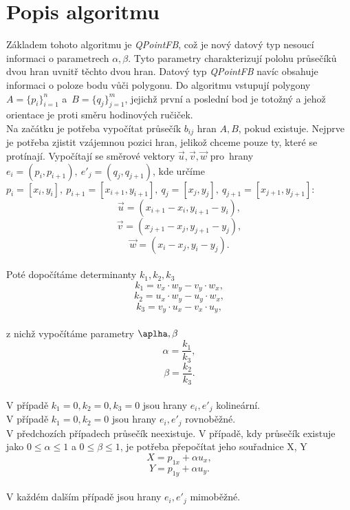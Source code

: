 \documentclass{article}
\begin{document}
\section{\large{Popis algoritmu}}
Základem tohoto algoritmu je \emph{QPointFB}, což je nový datový typ nesoucí informaci o parametrech $\alpha, \beta$. Tyto parametry charakterizují polohu průsečíků dvou hran uvnitř těchto dvou hran. Datový typ \emph{QPointFB} navíc obsahuje informaci o poloze bodu vůči polygonu. Do algoritmu vstupují polygony $A =\{p_{i}\}_{i=1}^n$ a~$B =\{q_{j}\}_{j=1}^m$, jejichž první a poslední bod je totožný a jehož orientace je proti směru hodinových ručiček.\\
Na začátku je potřeba vypočítat průsečík $b_{ij}$ hran $A, B$, pokud existuje. Nejprve je potřeba zjistit vzájemnou pozici hran, jelikož chceme pouze ty, které se protínají. Vypočítají se směrové vektory $\vec{u}, \vec{v}, \vec{w}$ pro~hrany $e_{i} = (p_{i}, p_{i+1}),~e'_{j} = (q_{j}, q_{j+1})$, kde určíme $p_{i} = [x_{i}, y_{i}],~p_{i+1} = [x_{i+1}, y_{i+1}],~q_{j} = [x_{j}, y_{j}],~q_{j+1} = [x_{j+1}, y_{j+1}]$:\\
\[\vec{u} = (x_{i+1} - x_{i}, y_{i+1} - y_{i}),\]
\[\vec{v} = (x_{j+1} - x_{j}, y_{j+1} - y_{j}),\]
\[\vec{w} = (x_{i} - x_{j}, y_{i} - y_{j}).\]
\vspace{0cm}\\
Poté dopočítáme determinanty $k_{1}, k_{2}, k_{3}$\\
\[k_{1} = v_{x} \cdot w_{y} - v_{y} \cdot w_{x},\]
\[k_{2} = u_{x} \cdot w_{y} - u_{y} \cdot w_{x},\]
\[k_{3} = v_{y} \cdot u_{x} - v_{x} \cdot u_{y},\]
\vspace{0cm}\\
z nichž vypočítáme parametry $\aplha, \beta$\\
\[\alpha = \frac{k_{1}}{k_{3}},\]
\[\beta = \frac{k_{2}}{k_{3}}.\]
\vspace{0cm}\\
V případě $k_{1} = 0, k_{2} = 0, k_{3} = 0$ jsou hrany $e_{i}, e'_{j}$ kolineární.\\
V případě $k_{1} = 0, k_{2} = 0$ jsou hrany $e_{i}, e'_{j}$ rovnoběžné.\\
V předchozích případech průsečík neexistuje. V případě, kdy průsečík existuje jako $0 \leq \alpha \leq 1$ a $0 \leq \beta \leq 1$, je potřeba přepočítat jeho souřadnice X, Y\\
\[X = p_{1x} + \alpha u_{x},\]
\[Y = p_{1y} + \alpha u_{y}.\]
\vspace{0cm}\\
V každém dalším případě jsou hrany $e_{i}, e'_{j}$ mimoběžné.\\
\end{document}
